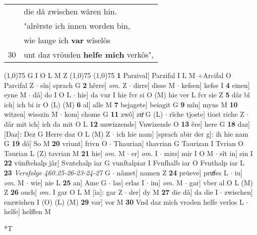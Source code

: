 \documentclass[8pt,a4paper,notitlepage]{article}
\begin{document}
\begin{table}[ht]
\begin{minipage}[t]{0.5\linewidth}
\begin{tabular}{rl}
 & die dâ zwischen wâren hin.\\ 
 & "alrêrste ich innen worden bin,\\ 
 & wie lange ich \textbf{var} wîselôs\\ 
30 & unt daz vröuden \textbf{helfe mich} verkôs",\\ 
\end{tabular}
\scriptsize
\line(1,0){75} \newline
G I O L M Z \newline
\line(1,0){75} \newline
\newline
\line(1,0){75} \newline
\textbf{1} Parzival] Parzifal I L M ÷Arcifal O Parcifal Z  $\cdot$ sîn] sprach G \textbf{2} hêrre] \textit{om.} Z  $\cdot$ dirre] disse M  $\cdot$ kefsen] kefse I \textbf{4} einen] eyne M  $\cdot$ dâ] do I O L  $\cdot$ hie] da vur I hie fvr si O (M) hie ver L fvr sie Z \textbf{5} dâr bî ich] ich bi ir O (L) (M) \textbf{6} al] alle M \textbf{7} bejagete] beiagit G \textbf{9} mîn] myns M \textbf{10} witzen] wisszin M  $\cdot$ kom] chome G \textbf{11} zwô] zuͦ G (L)  $\cdot$ rîche tjoste] tiost riche Z  $\cdot$ dâr mit ich] ich da mit O L \textbf{12} unwizzende] Vnwizende O \textbf{13} êre] here G \textbf{18} daz] [Daz]: Dez G Herre daz O L (M) Z  $\cdot$ ich hie nam] [sprach abir der g]: ih hie nam G \textbf{19} dô] So M \textbf{20} vriunt] frivn O  $\cdot$ Thaurian] thavrian G Taurizan I Tvrian O Taurian L (Z) tavrian M \textbf{21} hie] \textit{om.} M  $\cdot$ er] \textit{om.} I  $\cdot$ mirs] mir I O M  $\cdot$ sît in] sin I \textbf{22} vünftehalp jâr] Svntehalp iar G vunftalpiar I Fvnfhalb iar O Fvnthalp iar L \textbf{23} \textit{Versfolge 460.25-26-23-24-27} G   $\cdot$ nâmet] namen Z \textbf{24} prüeve] pruͯfes L  $\cdot$ iu] \textit{om.} M  $\cdot$ wie] nie L \textbf{25} an] Ame G  $\cdot$ las] erlas I  $\cdot$ im] \textit{om.} M  $\cdot$ gar] vber al O L (M) Z \textbf{26} ouch] \textit{om.} I gar O L M [ia]: gar Z  $\cdot$ der] dy M \textbf{27} die dâ] da die I  $\cdot$ zwischen] enzwishen I (O) (L) (M) \textbf{29} var] vor M \textbf{30} Vnd daz mich vroden helfe verlos L  $\cdot$ helfe] helffen M \newline
\end{minipage}
\hspace{0.5cm}
\begin{minipage}[t]{0.5\linewidth}
\small
\begin{center}*T
\end{center}
\begin{tabular}{rl}

\end{tabular}
\end{minipage}
\end{table}
\end{document}
